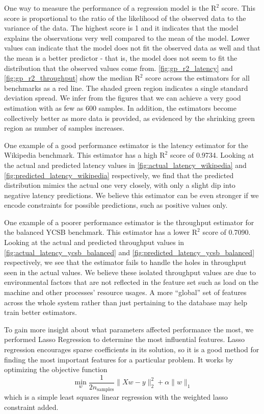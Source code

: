 One way to measure the performance of a regression model is the
$\textrm{R}^2$ score. This score is proportional to the ratio of the
likelihood of the observed data to the variance of the data. The
highest score is 1 and it indicates that the model explains the
observations very well compared to the mean of the model. Lower values
can indicate that the model does not fit the observed data as well and
that the mean is a better predictor - that is, the model does not seem
to fit the distribution that the observed values come
from. \cref{fig:gp_r2_latency} and \cref{fig:gp_r2_throughput} show
the median $\textrm{R}^2$ score across the estimators for all
benchmarks as a red line. The shaded green region indicates a single
standard deviation spread. We infer from the figures that we can
achieve a very good estimation with as few as 600 samples. In
addition, the estimators become collectively better as more data is
provided, as evidenced by the shrinking green region as number of
samples increases.

One example of a good performance estimator is the latency estimator
for the Wikipedia benchmark. This estimator has a high $\textrm{R}^2$
score of 0.9734. Looking at the actual and predicted latency values in
\cref{fig:actual_latency_wikipedia} and
\cref{fig:predicted_latency_wikipedia} respectively, we find that the
predicted distribution mimics the actual one very closely, with only a
slight dip into negative latency predictions. We believe this
estimator can be even stronger if we encode constraints for possible
predictions, such as positive values only.

One example of a poorer performance estimator is the throughput
estimator for the balanced YCSB benchmark. This estimator has a lower
$\textrm{R}^2$ score of 0.7090. Looking at the actual and predicted
throughput values in \cref{fig:actual_latency_ycsb_balanced} and
\cref{fig:predicted_latency_ycsb_balanced} respectively, we see that
the estimator fails to handle the holes in throughput seen in the
actual values. We believe these isolated throughput values are due to
environmental factors that are not reflected in the feature set such
as load on the machine and other processes' resource usages. A more
``global'' set of features across the whole system rather than just
pertaining to the database may help train better estimators.

To gain more insight about what parameters affected performance the
most, we performed Lasso Regression to determine the most influential
features. Lasso regression encourages sparse coefficients in its
solution, so it is a good method for finding the most important
features for a particular problem. It works by optimizing the
objective function
\begin{equation*}
  \min\limits_{w}
  \frac{1}{2n_{\textrm{samples}}} \|Xw - y\|_2^2 + \alpha \|w\|_1
\end{equation*}
which is a simple least squares linear regression with the weighted
lasso constraint added.

